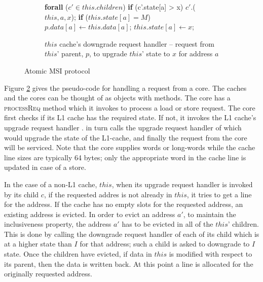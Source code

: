 \begin{figure}
\begin{subfigure}{\linewidth}
\begin{boxedminipage}{\linewidth}
\begin{algorithmic}
    \State \textbf{forall} ($c' \in this.children$)
    \State \;\;\;\; \textbf{if} (c'.state[a] > x)
    \State \;\;\;\;\;\;\;\; \call{} $c'.$\dReq($this, a, x$);
    \State \textbf{if} ($this.state[a] = M$)
    \State \;\;\;\; $p.data[a] \gets this.data[a]$;
    \State $this.state[a] \gets x$;
  \EndIf
\EndProc
\end{algorithmic}
\end{boxedminipage}
\caption{$this$ cache's downgrade request handler -- request from $this$' parent, $p$, to upgrade $this$' state to $x$ for address $a$ }
\label{atomicDReq1}
\end{subfigure}

\caption{Atomic MSI protocol}
\label{msi-simple}
\end{figure}

Figure \ref{msi-simple} gives the pseudo-code for handling a request from a
core. The caches and the cores can be thought of as objects with methods. The
core has a \textsc{processReq} method which it invokes to process a load or
store request. The core first checks if its L1 cache has the required state. If
not, it invokes the L1 cache's upgrade request handler \uReq{}. \uReq{} in turn
calls the upgrade request handler of which would upgrade the state of the
L1-cache, and finally the request from the core will be serviced. Note that the
core supplies words or long-words while the cache line sizes are typically 64
bytes; only the appropriate word in the cache line is updated in case of a
store.

In the case of a non-L1 cache, $this$, when its upgrade request handler is
invoked by its child $c$, if the requested addres is not already in $this$, it
tries to get a line for the address. If the cache has no empty slots for the
requested address, an existing address is evicted. In order to evict an address
$a'$, to maintain the inclusiveness property, the address $a'$ has to be evicted
in all of the $this$' children. This is done by calling the downgrade request
handler \dReq{} of each of its child which is at a higher state than $I$ for
that address; such a child is asked to downgrade to $I$ state. Once the children
have evicted, if data in $this$ is modified with respect to its parent, then the
data is written back. At this point a line is allocated for the originally
requested address.

